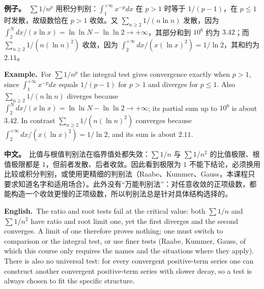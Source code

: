 \documentclass[UTF8,11pt,a4paper]{ctexart}
\newcommand{\BOTH}[2]{\par\noindent\textbf{中文。}\ #1\par\noindent\textbf{English.}\ #2\par}
\newcommand{\EX}[2]{\par\noindent\textbf{例子。}\ #1\par\noindent\textbf{Example.}\ #2\par}
\begin{document}
\EX{$\sum1/n^p$ 用积分判别：$\int_1^{+\infty}x^{-p}dx$ 在 $p>1$ 时等于 $1/(p-1)$，在 $p\le1$ 时发散，故级数恰在 $p>1$ 收敛。又 $\sum_{n\ge2}1/(n\ln n)$ 发散，因为 $\int_2^{N}dx/(x\ln x)=\ln\ln N-\ln\ln2\to+\infty$，其部分和到 $10^6$ 约为 $3.42$；而 $\sum_{n\ge2}1/(n(\ln n)^2)$ 收敛，因为 $\int_2^{+\infty}dx/(x(\ln x)^2)=1/\ln2$，其和约为 $2.11$。}{For $\sum1/n^p$ the integral test gives convergence exactly when $p>1$, since $\int_1^{+\infty}x^{-p}dx$ equals $1/(p-1)$ for $p>1$ and diverges for $p\le1$. Also $\sum_{n\ge2}1/(n\ln n)$ diverges because $\int_2^{N}dx/(x\ln x)=\ln\ln N-\ln\ln2\to+\infty$; its partial sum up to $10^6$ is about $3.42$. In contrast $\sum_{n\ge2}1/(n(\ln n)^2)$ converges because $\int_2^{+\infty}dx/(x(\ln x)^2)=1/\ln2$, and its sum is about $2.11$.}
\BOTH{比值与根值判别法在临界值处都失效：$\sum1/n$ 与 $\sum1/n^2$ 的比值极限、根值极限都是 $1$，但前者发散、后者收敛。因此看到极限为 $1$ 不能下结论，必须换用比较或积分判别，或使用更精细的判别法（Raabe、Kummer、Gauss，本课程只要求知道名字和适用场合）。此外没有“万能判别法”：对任意收敛的正项级数，都能构造一个收敛更慢的正项级数，所以判别法总是针对具体结构选择的。}{The ratio and root tests fail at the critical value: both $\sum1/n$ and $\sum1/n^2$ have ratio and root limit one, yet the first diverges and the second converges. A limit of one therefore proves nothing; one must switch to comparison or the integral test, or use finer tests (Raabe, Kummer, Gauss, of which this course only requires the names and the situations where they apply). There is also no universal test: for every convergent positive-term series one can construct another convergent positive-term series with slower decay, so a test is always chosen to fit the specific structure.}
\end{document}
